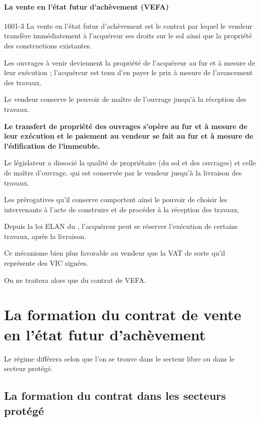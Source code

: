 \paragraph{La vente en l’état futur d’achèvement (VEFA)}
\begin{citationArticleCciv}{1601-3}
	La vente en l’état futur d’achèvement est le contrat par lequel le vendeur transfère immédiatement à l’acquéreur ses droits sur le sol ainsi que la propriété des constructions existantes.

	Les ouvrages à venir deviennent la propriété de l’acquéreur au fur et à mesure de leur exécution ; l’acquéreur est tenu d’en payer le prix à mesure de l’avancement des travaux.

	Le vendeur conserve le pouvoir de maître de l’ouvrage jusqu’à la réception des travaux.
\end{citationArticleCciv}

{\bfseries Le transfert de propriété des ouvrages s'opère au fur et à mesure de leur exécution et le paiement au vendeur se fait au fur et à mesure de l’édification de l’immeuble.
}

\medskip Le législateur a dissocié la qualité de propriétaire (du sol et des ouvrages) et celle de maître d'ouvrage, qui est conservée par le vendeur jusqu'à la livraison des travaux.

Les prérogatives qu'il conserve comportent ainsi le pouvoir de choisir les intervenants à l’acte de construire et de procéder à la réception des travaux.

\medskip Depuis la loi ELAN du , l’acquéreur peut se réserver l’exécution de certains travaux, après la livraison.

\medskip Ce mécanisme bien plus favorable au vendeur que la VAT de sorte qu’il représente  des VIC signées.

On ne traitera alors que du contrat de VEFA.

\section{La formation du contrat de vente en l'état futur d'achèvement}

	Le régime différera selon que l’on se trouve dans le secteur libre ou dans le secteur protégé.

	\subsection{La formation du contrat dans les secteurs protégé}

